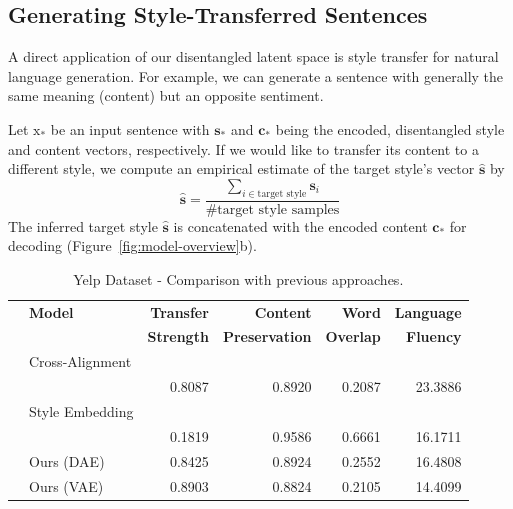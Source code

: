 \documentclass[11pt,a4paper]{article}
\newcommand{\rmx}{\mathrm x}
\begin{document}
\subsection{Generating Style-Transferred Sentences} \label{ss:prediction}

A direct application of our disentangled latent space is style transfer for natural language generation. For example, we can generate a sentence with generally the same meaning (content) but an opposite sentiment.

Let $\rmx_*$ be an input sentence with $\bm s_*$ and $\bm c_*$ being the encoded, disentangled style and content vectors, respectively. If we would like to transfer its content to a different style, we compute an empirical estimate of the target style's vector $\hat{\bm s}$ by
\begin{equation*}
	\hat{\bm s}=\frac{\sum_{i\in\text{target style}}\bm s_i}{\text{\# target style samples}}
\end{equation*}
The inferred target style $\hat{\bm s}$ is concatenated with the encoded content $\bm c_*$ for decoding (Figure~\ref{fig:model-overview}b).


\begin{table}[ht!]
	\centering
	\begin{tabular}{| c | l | r | r | r | r |}
		\hline
		\multirow{2}{*}{
		} & \textbf{Model}        & \textbf{Transfer} & \textbf{Content}      & \textbf{Word}    & \textbf{Language} \\
		  &                       & \textbf{Strength} & \textbf{Preservation} & \textbf{Overlap} & \textbf{Fluency}  \\
		\hline
		\hline
		\multirow{2}{*}{
		} & Cross-Alignment       &                   &                       &                  &                   \\
		  & \citep{shen2017style} & 0.8087            & 0.8920                & 0.2087           & 23.3886           \\
		\hline
		\multirow{2}{*}{
		} & Style Embedding       &                   &                       &                  &                   \\
		  & \citep{fu2017style}   & 0.1819            & 0.9586                & 0.6661           & 16.1711           \\
		\hline
		  & Ours (DAE)            & 0.8425            & 0.8924                & 0.2552           & 16.4808           \\
		\hline
		  & Ours (VAE)            & 0.8903            & 0.8824                & 0.2105           & 14.4099           \\
		\hline
	\end{tabular}
	\caption{Yelp Dataset - Comparison with previous approaches.}
	\label{tab:yelp-comparison-previous}
\end{table}
\end{document}
